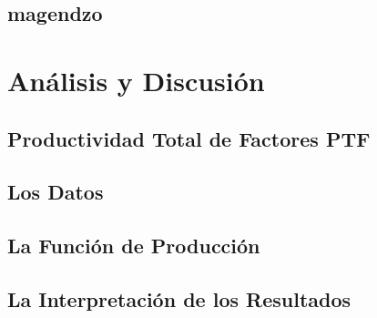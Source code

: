 \documentclass[upright, contnum, 11pt]{article}
\begin{document}
\clearpage
\subsection{magendzo}



\clearpage
\subsection{\cite{corbo}}




\section{Análisis y Discusión}
\clearpage
%

\subsection{Productividad Total de Factores PTF}


\subsection{Los Datos}


\subsection{La Función de Producción}
%

\subsection{La Interpretación de los Resultados}
%

%

\clearpage

\nocite{*}


\end{document}
